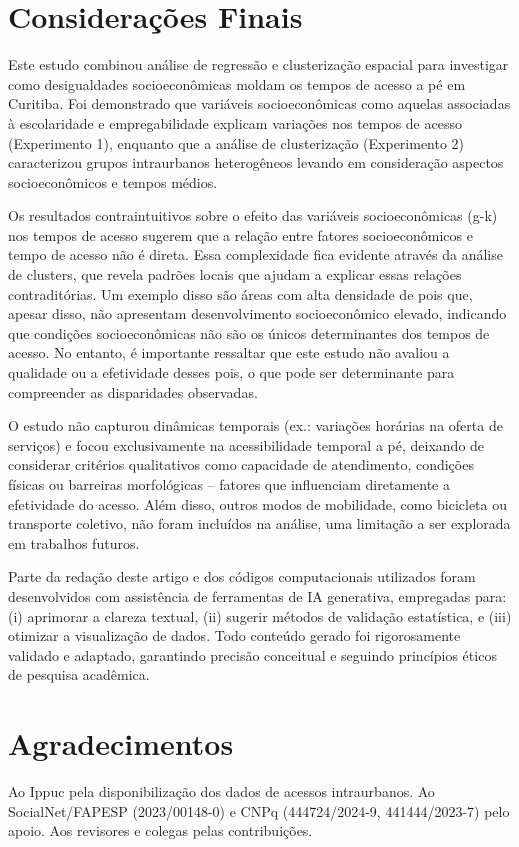 \section{Considerações Finais}
\label{sec:considerations}

Este estudo combinou análise de regressão e clusterização espacial para investigar como desigualdades socioeconômicas moldam os tempos de acesso a pé em Curitiba. Foi demonstrado que variáveis socioeconômicas como aquelas associadas à escolaridade e empregabilidade explicam variações nos tempos de acesso (Experimento 1), enquanto que a análise de clusterização (Experimento 2) caracterizou grupos intraurbanos heterogêneos levando em consideração aspectos socioeconômicos e tempos médios.

Os resultados contraintuitivos sobre o efeito das variáveis socioeconômicas (g-k) nos tempos de acesso sugerem que a relação entre fatores socioeconômicos e tempo de acesso não é direta. Essa complexidade fica evidente através da análise de clusters, que revela padrões locais que ajudam a explicar essas relações contraditórias. Um exemplo disso são áreas com alta densidade de \ac{pois} que, apesar disso, não apresentam desenvolvimento socioeconômico elevado, indicando que condições socioeconômicas não são os únicos determinantes dos tempos de acesso. No entanto, é importante ressaltar que este estudo não avaliou a qualidade ou a efetividade desses \ac{pois}, o que pode ser determinante para compreender as disparidades observadas.

O estudo não capturou dinâmicas temporais (ex.: variações horárias na oferta de serviços) e focou exclusivamente na acessibilidade temporal a pé, deixando de considerar critérios qualitativos como capacidade de atendimento, condições físicas ou barreiras morfológicas – fatores que influenciam diretamente a efetividade do acesso. Além disso, outros modos de mobilidade, como bicicleta ou transporte coletivo, não foram incluídos na análise, uma limitação a ser explorada em trabalhos futuros.

Parte da redação deste artigo e dos códigos computacionais utilizados foram desenvolvidos com assistência de ferramentas de IA generativa, empregadas para: (i) aprimorar a clareza textual, (ii) sugerir métodos de validação estatística, e (iii) otimizar a visualização de dados. Todo conteúdo gerado foi rigorosamente validado e adaptado, garantindo precisão conceitual e seguindo princípios éticos de pesquisa acadêmica.

\section{Agradecimentos}
\label{sec:acknoledgments}

Ao Ippuc pela disponibilização dos dados de acessos intraurbanos. Ao SocialNet/FAPESP (2023/00148-0) e CNPq (444724/2024-9, 441444/2023-7) pelo apoio. Aos revisores e colegas pelas contribuições.